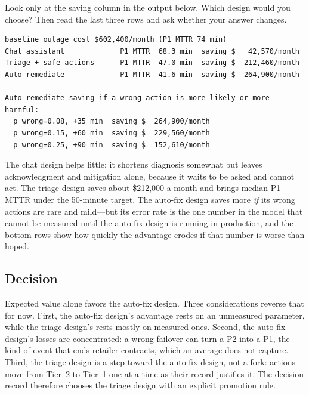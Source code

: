 

\begin{thinkabout}
Look only at the saving column in the output below. Which design would you choose? Then read the last three rows and ask whether your answer changes.
\end{thinkabout}

\begin{lstlisting}[language={}, numbers=none, frame=none, xleftmargin=1.5em]
baseline outage cost $602,400/month (P1 MTTR 74 min)
Chat assistant             P1 MTTR  68.3 min  saving $   42,570/month
Triage + safe actions      P1 MTTR  47.0 min  saving $  212,460/month
Auto-remediate             P1 MTTR  41.6 min  saving $  264,900/month

Auto-remediate saving if a wrong action is more likely or more harmful:
  p_wrong=0.08, +35 min  saving $  264,900/month
  p_wrong=0.15, +60 min  saving $  229,560/month
  p_wrong=0.25, +90 min  saving $  152,610/month
\end{lstlisting}

The chat design helps little: it shortens diagnosis somewhat but leaves acknowledgment and mitigation alone, because it waits to be asked and cannot act. The triage design saves about \$212{,}000 a month and brings median P1 MTTR under the 50-minute target. The auto-fix design saves more \emph{if} its wrong actions are rare and mild---but its error rate is the one number in the model that cannot be measured until the auto-fix design is running in production, and the bottom rows show how quickly the advantage erodes if that number is worse than hoped.

\subsection{Decision}

Expected value alone favors the auto-fix design. Three considerations reverse that for now. First, the auto-fix design's advantage rests on an unmeasured parameter, while the triage design's rests mostly on measured ones. Second, the auto-fix design's losses are concentrated: a wrong failover can turn a P2 into a P1, the kind of event that ends retailer contracts, which an average does not capture. Third, the triage design is a step toward the auto-fix design, not a fork: actions move from Tier~2 to Tier~1 one at a time as their record justifies it. The decision record therefore chooses the triage design with an explicit promotion rule.

